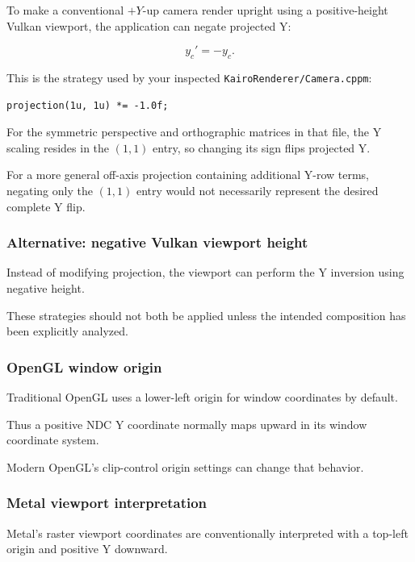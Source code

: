 To make a conventional \(+Y\)-up camera render upright using a positive-height Vulkan viewport, the application can negate projected Y:

\[
 \boxed{ y_c'=-y_c }.
\]

This is the strategy used by your inspected \texttt{KairoRenderer/Camera.cppm}:

\begin{verbatim}
projection(1u, 1u) *= -1.0f;
\end{verbatim}

For the symmetric perspective and orthographic matrices in that file, the Y scaling resides in the \((1,1)\) entry, so changing its sign flips projected Y.

For a more general off-axis projection containing additional Y-row terms, negating only the \((1,1)\) entry would not necessarily represent the desired complete Y flip.

\subsubsection{Alternative: negative Vulkan viewport height}\label{alternative-negative-vulkan-viewport-height}

Instead of modifying projection, the viewport can perform the Y inversion using negative height.

These strategies should not both be applied unless the intended composition has been explicitly analyzed.

\subsubsection{OpenGL window origin}\label{opengl-window-origin}

Traditional OpenGL uses a lower-left origin for window coordinates by default.

Thus a positive NDC Y coordinate normally maps upward in its window coordinate system.

Modern OpenGL's clip-control origin settings can change that behavior.

\subsubsection{Metal viewport interpretation}\label{metal-viewport-interpretation}

Metal's raster viewport coordinates are conventionally interpreted with a top-left origin and positive Y downward.

